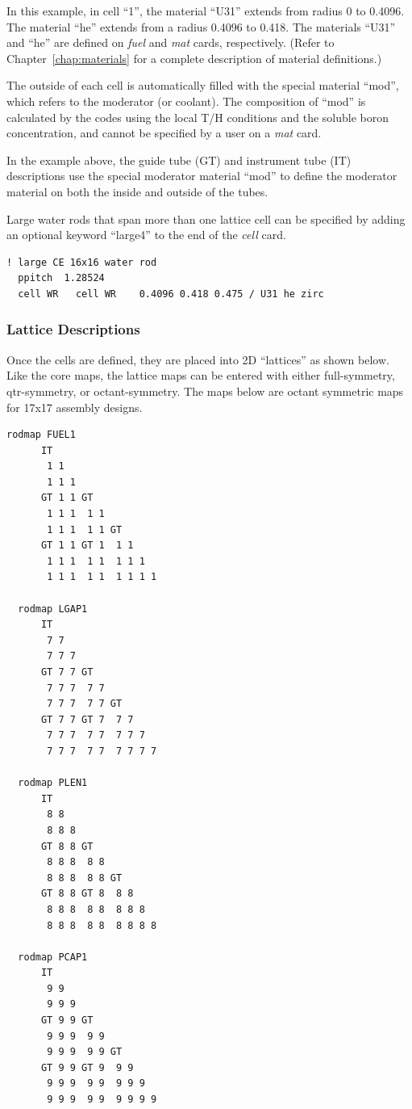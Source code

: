 In this example, in cell ``1'', the material ``U31'' extends from radius 0 to 0.4096.
The material ``he'' extends from a radius 0.4096 to 0.418.
The materials ``U31'' and ``he'' are defined on {\it fuel} and {\it mat} cards, respectively.
(Refer to Chapter~\ref{chap:materials} for a complete description of material definitions.)

The outside of each cell is automatically filled with the special material ``mod'', which
refers to the moderator (or coolant).
The composition of ``mod'' is calculated by the codes using the local T/H conditions and the
soluble boron concentration, and cannot be specified by a user on a {\it mat} card.

In the example above, the guide tube (GT) and instrument tube (IT) descriptions
use the special moderator material ``mod'' to define the moderator material on both
the inside and outside of the tubes.

Large water rods that span more than one lattice cell can be specified by adding an optional keyword ``large4''
to the end of the {\it cell} card.
\begin{Verbatim}[fontsize=\small]
! large CE 16x16 water rod
  ppitch  1.28524
  cell WR   cell WR    0.4096 0.418 0.475 / U31 he zirc
\end{Verbatim}

\subsubsection{Lattice Descriptions}

Once the cells are defined, they are placed into 2D ``lattices'' as shown below.
Like the core maps, the lattice maps can be entered with either full-symmetry, qtr-symmetry,
or octant-symmetry.  The maps below are octant symmetric maps for 17x17 assembly designs.
\vfill   %
\begin{Verbatim}[fontsize=\small]
  rodmap FUEL1
      IT
       1 1
       1 1 1
      GT 1 1 GT
       1 1 1  1 1
       1 1 1  1 1 GT
      GT 1 1 GT 1  1 1
       1 1 1  1 1  1 1 1
       1 1 1  1 1  1 1 1 1

  rodmap LGAP1
      IT
       7 7
       7 7 7
      GT 7 7 GT
       7 7 7  7 7
       7 7 7  7 7 GT
      GT 7 7 GT 7  7 7
       7 7 7  7 7  7 7 7
       7 7 7  7 7  7 7 7 7

  rodmap PLEN1
      IT
       8 8
       8 8 8
      GT 8 8 GT
       8 8 8  8 8
       8 8 8  8 8 GT
      GT 8 8 GT 8  8 8
       8 8 8  8 8  8 8 8
       8 8 8  8 8  8 8 8 8

  rodmap PCAP1
      IT
       9 9
       9 9 9
      GT 9 9 GT
       9 9 9  9 9
       9 9 9  9 9 GT
      GT 9 9 GT 9  9 9
       9 9 9  9 9  9 9 9
       9 9 9  9 9  9 9 9 9
\end{Verbatim}

